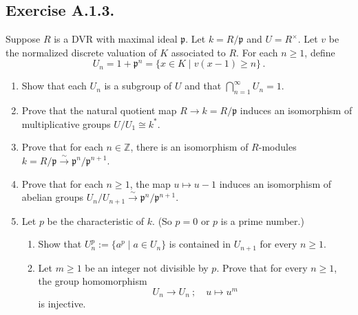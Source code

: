 \documentclass[12pt, a4paper]{article}
\begin{document}
\subsection*{Exercise A.1.3.} 
Suppose $R$ is a DVR with maximal ideal $\mathfrak{p}$. Let $k = R/\mathfrak{p}$ and $U = R^{\times}$. Let $v$ be the normalized discrete valuation of $K$ associated to $R$. For each $n \geq 1$, define
\[
U_n = 1 + \mathfrak{p}^n = \{x \in K \mid v(x - 1) \geq n\} \, .
\]

\begin{enumerate}
    \item Show that each $U_n$ is a subgroup of $U$ and that $\bigcap_{n=1}^{\infty} U_n = 1$.
    \item Prove that the natural quotient map $R \to k = R/\mathfrak{p}$ induces an isomorphism of multiplicative groups $U/U_1 \cong k^*$.
    \item Prove that for each $n \in \mathbb{Z}$, there is an isomorphism of $R$-modules $k = R/\mathfrak{p} \xrightarrow{\sim} \mathfrak{p}^n/\mathfrak{p}^{n+1}$.
    \item Prove that for each $n \geq 1$, the map $u \mapsto u - 1$ induces an isomorphism of abelian groups $U_n/U_{n+1} \xrightarrow{\sim} \mathfrak{p}^n/\mathfrak{p}^{n+1}$.
    \item Let $p$ be the characteristic of $k$. (So $p = 0$ or $p$ is a prime number.)
    \begin{enumerate}
        \item[(a)] Show that $U_n^p := \{a^p \mid a \in U_n\}$ is contained in $U_{n+1}$ for every $n \geq 1$.
        \item[(b)] Let $m \geq 1$ be an integer not divisible by $p$. Prove that for every $n \geq 1$, the group homomorphism
        \[
        U_n \longrightarrow U_n \ ; \quad u \longmapsto u^m
        \]
        is injective.
    \end{enumerate}
\end{enumerate}
\end{document}
